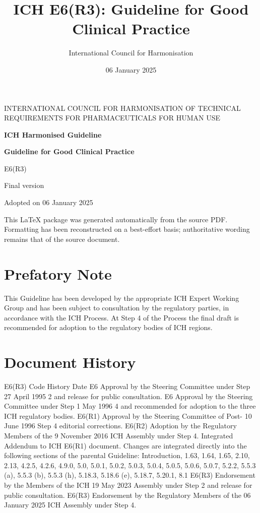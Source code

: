 \documentclass[11pt]{article}
\title{ICH E6(R3): Guideline for Good Clinical Practice}
\author{International Council for Harmonisation}
\date{06 January 2025}
\begin{document}
\begin{titlepage}
\centering
{\Large INTERNATIONAL COUNCIL FOR HARMONISATION OF TECHNICAL REQUIREMENTS FOR PHARMACEUTICALS FOR HUMAN USE\par}
\vspace{1.5cm}
{\Huge\bfseries ICH Harmonised Guideline\par}
\vspace{0.5cm}
{\LARGE\bfseries Guideline for Good Clinical Practice\par}
\vspace{0.3cm}
{\Large E6(R3)\par}
\vspace{0.8cm}
{\large Final version\par}
\vspace{0.2cm}
{\large Adopted on 06 January 2025\par}
\vfill
{\small This LaTeX package was generated automatically from the source PDF. Formatting has been reconstructed on a best-effort basis; authoritative wording remains that of the source document.\par}
\end{titlepage}

\tableofcontents
\clearpage
\section*{Prefatory Note}

This Guideline has been developed by the appropriate ICH Expert Working Group and has been subject to consultation by the regulatory parties, in accordance with the ICH Process. At Step 4 of the Process the final draft is recommended for adoption to the regulatory bodies of ICH regions.

\section*{Document History}

E6(R3)  Code History Date E6 Approval by the Steering Committee under Step 27 April 1995 2 and release for public consultation. E6 Approval by the Steering Committee under Step 1 May 1996 4 and recommended for adoption to the three ICH regulatory bodies. E6(R1) Approval by the Steering Committee of Post- 10 June 1996 Step 4 editorial corrections. E6(R2) Adoption by the Regulatory Members of the 9 November 2016 ICH Assembly under Step 4. Integrated Addendum to ICH E6(R1) document. Changes are integrated directly into the following sections of the parental Guideline: Introduction, 1.63, 1.64, 1.65, 2.10, 2.13, 4.2.5, 4.2.6, 4.9.0, 5.0, 5.0.1, 5.0.2, 5.0.3, 5.0.4, 5.0.5, 5.0.6, 5.0.7, 5.2.2, 5.5.3 (a), 5.5.3 (b), 5.5.3 (h), 5.18.3, 5.18.6 (e), 5.18.7, 5.20.1, 8.1 E6(R3) Endorsement by the Members of the ICH 19 May 2023 Assembly under Step 2 and release for public consultation. E6(R3) Endorsement by the Regulatory Members of the 06 January 2025 ICH Assembly under Step 4.
\end{document}
